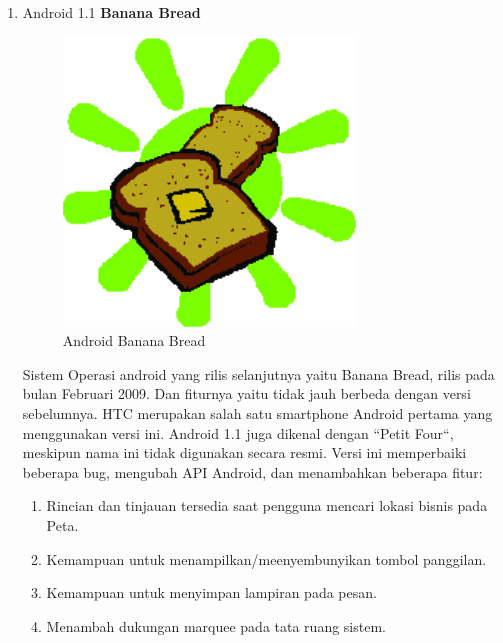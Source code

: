 \begin{enumerate}
\item Android 1.1 \textbf{Banana Bread}\\
\begin{figure}[!htbp]
    \centering
    \includegraphics[scale = 1.2]{pictures/android-banana-bread.jpg}
    \caption{Android Banana Bread}
    \label{}
\end{figure}

Sistem Operasi android yang rilis selanjutnya yaitu Banana Bread, rilis pada bulan Februari 2009. Dan fiturnya yaitu tidak jauh berbeda dengan versi sebelumnya. HTC merupakan salah satu smartphone Android pertama yang menggunakan versi ini. Android 1.1 juga dikenal dengan “Petit Four“, meskipun nama ini tidak digunakan secara resmi. Versi ini memperbaiki beberapa bug, mengubah API Android, dan menambahkan beberapa fitur:
\begin{enumerate}
    \item Rincian dan tinjauan tersedia saat pengguna mencari lokasi bisnis pada Peta.
    \item Kemampuan untuk menampilkan/meenyembunyikan tombol panggilan.
    \item Kemampuan untuk menyimpan lampiran pada pesan.
    \item Menambah dukungan marquee pada tata ruang sistem.
\end{enumerate}



\end{enumerate}
